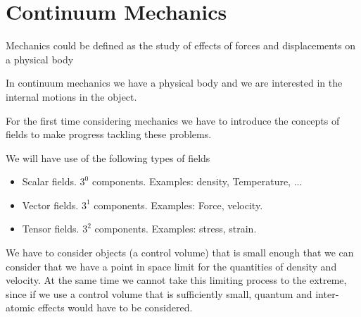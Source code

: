 % 
% 
% 
% 
% 
% 
% 
% 
% 
% 
% 
% 
\section{Continuum Mechanics}


Mechanics could be defined as the study of effects of forces and displacements on a physical body


In continuum mechanics we have a physical body and we are interested in the internal motions in the object.


For the first time considering mechanics we have to introduce the concepts of fields to make progress tackling these problems.

We will have use of the following types of fields

\begin{itemize}
\item Scalar fields.  $3^0$ components.  Examples: density, Temperature, ...
\item Vector fields.  $3^1$ components.  Examples: Force, velocity.
\item Tensor fields.  $3^2$ components.  Examples: stress, strain.
\end{itemize}

We have to consider objects (a control volume) that is small enough that we can consider that we have a point in space limit for the quantities of density and velocity.  At the same time we cannot take this limiting process to the extreme, since if we use a control volume that is sufficiently small, quantum and inter-atomic effects would have to be considered.

